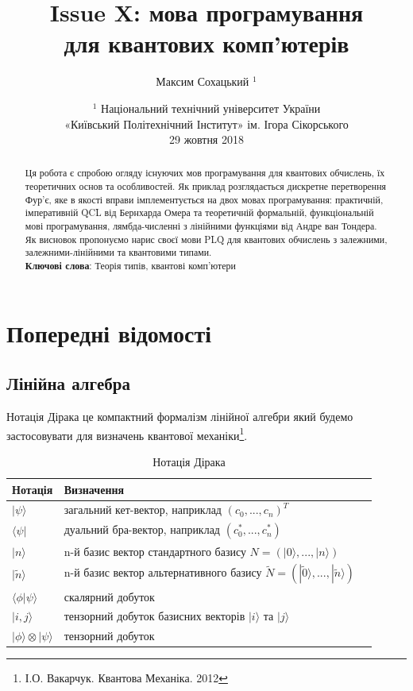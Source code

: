 \documentclass{article}
\theoremstyle{definition}
\begin{document}
\title{Issue X: мова програмування \\ для квантових комп'ютерів}
\author{Максим Сохацький $^1$}
\date{ \small $^1$ Національний технічний університет України \\
       «Київський Політехнічний Інститут» ім. Ігора Сікорського \\
       29 жовтня 2018 }
\maketitle

\begin{abstract}
Ця робота є спробою огляду існуючих мов програмування для квантових обчислень,
їх теоретичних основ та особливостей.
Як приклад розглядається дискретне перетворення Фур'є,
яке в якості вправи імплементується на двох мовах програмування:
практичній, імперативній QCL від Бернхарда Омера\cite{Omer2003} та
теоретичній формальній, функціональній мові програмування, лямбда-численні
з лінійними функціями від Андре ван Тондера\cite{Tonder2004}. Як висновок
пропонуємо нарис своєї мови PLQ для квантових обчислень з залежними,
залежними-лінійними та квантовими типами.
\\
{\bf Ключові слова}: Теорія типів, квантові комп'ютери
\end{abstract}
\tableofcontents

\newpage

\section{Попередні відомості}

\subsection{Лінійна алгебра}
Нотація Дірака це компактний формалізм лінійної алгебри який будемо застосовувати
для визначень квантової механіки\footnote{І.О. Вакарчук. Квантова Механіка. 2012}.

\begin{table}[h]
\centering
  \caption{Нотація Дірака}
 \begin{tabular}{lll}
    \hline
       Нотація & Визначення \\
    \hline
       $|\psi\rangle$ & загальний кет-вектор, наприклад $(c_0,...,c_n)^T$ \\
       $\langle\psi|$ & дуальний бра-вектор, наприклад $(c_0^*,...,c_n^*)$ \\
       $|n\rangle$ & n-й базис вектор стандартного базису $N=(|0\rangle,...,|n\rangle)$\\
       $|\tilde{n}\rangle$ & n-й базис вектор альтернативного базису $\tilde{N}=(|\tilde{0}\rangle,...,|\tilde{n}\rangle)$ \\
       $\langle\phi|\psi\rangle$ & скалярний добуток \\
       $|i,j\rangle$ & тензорний добуток базисних векторів $|i\rangle$ та $|j\rangle$ \\
       $|\phi\rangle\otimes|\psi\rangle$ & тензорний добуток \\
    \hline
  \end{tabular}
\end{table}
\end{document}
